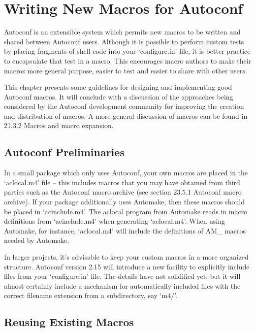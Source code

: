 \chapter{Writing New Macros for Autoconf}\label{C_Writing_New_Macros_for_Autoconf}

Autoconf is an extensible system which permits new macros to be written and shared between Autoconf users. Although it is possible to perform custom tests by placing fragments of shell code into your `configure.in' file, it is better practice to encapsulate that test in a macro. This encourages macro authors to make their macros more general purpose, easier to test and easier to share with other users.

This chapter presents some guidelines for designing and implementing good Autoconf macros. It will conclude with a discussion of the approaches being considered by the Autoconf development community for improving the creation and distribution of macros. A more general discussion of macros can be found in 21.3.2 Macros and macro expansion. 

\section{Autoconf Preliminaries}

In a small package which only uses Autoconf, your own macros are placed in 
the `aclocal.m4' file -- this includes macros that you may have obtained from 
third parties such as the Autoconf macro archive
(see section 23.5.1 Autoconf macro archive). If your package additionally uses Automake, then these macros should be placed in `acinclude.m4'. The aclocal program from Automake reads in macro definitions from `acinclude.m4' when generating `aclocal.m4'. When using Automake, for instance, `aclocal.m4' will include the definitions of AM\_{} macros needed by Automake.

In larger projects, it's advisable to keep your custom macros in a more organized structure. Autoconf version 2.15 will introduce a new facility to explicitly include files from your `configure.in' file. The details have not solidified yet, but it will almost certainly include a mechanism for automatically included files with the correct filename extension from a subdirectory, say `m4/'. 

\section{Reusing Existing Macros}

